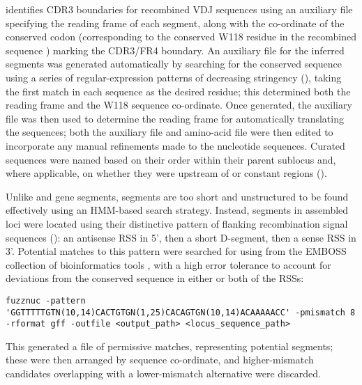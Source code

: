  \parencite{ye2013igblast} identifies CDR3 boundaries for recombined \igh{} VDJ sequences using an auxiliary file specifying the reading frame of each \jh segment, along with the co-ordinate of the conserved  codon (corresponding to the conserved W118 residue in the recombined sequence \parencite{lefranc2014immunoglobulins}) marking the CDR3/FR4 boundary. An auxiliary file for the inferred \jh segments was generated automatically by searching for the conserved sequence using a series of regular-expression patterns of decreasing stringency (), taking the first match in each sequence as the desired residue; this determined both the reading frame and the W118 sequence co-ordinate. Once generated, the auxiliary file was then used to determine the reading frame for automatically translating the \jh sequences; both the auxiliary file and amino-acid  file were then edited to incorporate any manual refinements made to the \jh nucleotide sequences. Curated \jh sequences were named based on their order within their parent sublocus and, where applicable, on whether they were upstream of  or  constant regions ().

\subsubsubsection{\dh}

\noindent Unlike \vh and \jh gene segments, \dh segments are too short and unstructured to be found effectively using an HMM-based search strategy. Instead, \dh segments in assembled loci were located using their distinctive pattern of flanking recombination signal sequences (): an antisense RSS in 5', then a short D-segment, then a sense RSS in 3'. Potential matches to this pattern were searched for using  from the EMBOSS collection of bioinformatics tools \parencite{rice2000emboss}, with a high error tolerance to account for deviations from the conserved sequence in either or both of the RSSs:

\begin{lstlisting}
fuzznuc -pattern 'GGTTTTTGTN(10,14)CACTGTGN(1,25)CACAGTGN(10,14)ACAAAAACC' -pmismatch 8 -rformat gff -outfile <output_path> <locus_sequence_path>
\end{lstlisting}

\noindent This generated a  file of permissive matches, representing potential \dh segments; these were then arranged by sequence co-ordinate, and higher-mismatch candidates overlapping with a lower-mismatch alternative were discarded.

